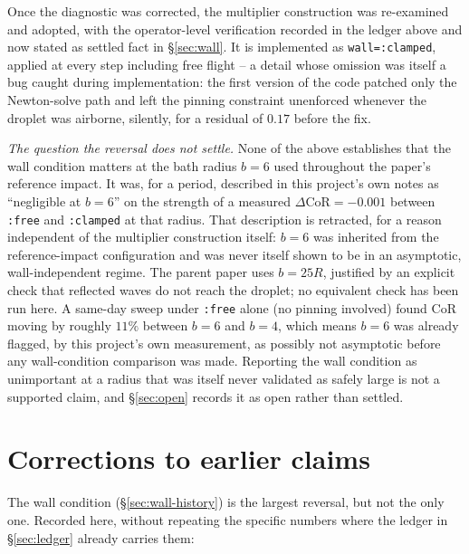 Once the diagnostic was corrected, the multiplier construction was re-examined and adopted, with the operator-level verification recorded in the ledger above and now stated as settled fact in \S\ref{sec:wall}. It is implemented as \texttt{wall=:clamped}, applied at every step including free flight -- a detail whose omission was itself a bug caught during implementation: the first version of the code patched only the Newton-solve path and left the pinning constraint unenforced whenever the droplet was airborne, silently, for a residual of $0.17$ before the fix.

\emph{The question the reversal does not settle.} None of the above establishes that the wall condition matters at the bath radius $b=6$ used throughout the paper's reference impact. It was, for a period, described in this project's own notes as ``negligible at $b=6$'' on the strength of a measured $\Delta\mathrm{CoR}=-0.001$ between \texttt{:free} and \texttt{:clamped} at that radius. That description is retracted, for a reason independent of the multiplier construction itself: $b=6$ was inherited from the reference-impact configuration and was never itself shown to be in an asymptotic, wall-independent regime. The parent paper \citep{AlventosaEtAl2023} uses $b=25R$, justified by an explicit check that reflected waves do not reach the droplet; no equivalent check has been run here. A same-day sweep under \texttt{:free} alone (no pinning involved) found $\mathrm{CoR}$ moving by roughly $11\%$ between $b=6$ and $b=4$, which means $b=6$ was already flagged, by this project's own measurement, as possibly not asymptotic before any wall-condition comparison was made. Reporting the wall condition as unimportant at a radius that was itself never validated as safely large is not a supported claim, and \S\ref{sec:open} records it as open rather than settled.

\section{Corrections to earlier claims}
\label{sec:corrections}

The wall condition (\S\ref{sec:wall-history}) is the largest reversal, but not the only one. Recorded here, without repeating the specific numbers where the ledger in \S\ref{sec:ledger} already carries them:

